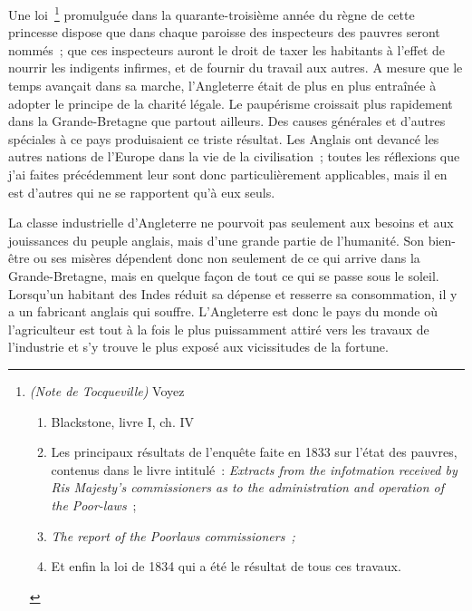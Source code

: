 \documentclass[twoside]{book} %
\begin{document}
Une loi \footnote{ \emph{(Note de Tocqueville)} Voyez\par
 
\begin{enumerate}[itemsep=0pt,topsep=0pt,partopsep=0pt,parskip=0pt]
\item Blackstone, livre I, ch. IV
\item Les principaux résultats de l’enquête faite en 1833 sur l’état des pauvres, contenus dans le livre intitulé : \emph{Extracts from the infotmation received by Ris Majesty's commissioners as to the administration and operation of the Poor-laws} ;
\item \emph{The report of the Poorlaws commissioners ;}
\item Et enfin la loi de 1834 qui a été le résultat de tous ces travaux.
\end{enumerate}

} promulguée dans la quarante-troisième année du règne de cette princesse dispose que dans chaque paroisse des inspecteurs des pauvres seront nommés ; que ces inspecteurs auront le droit de taxer les habitants à l’effet de nourrir les indigents infirmes, et de fournir du travail aux autres. A mesure que le temps avançait dans sa marche, l’Angleterre était de plus en plus entraînée à adopter le principe de la charité légale. Le paupérisme croissait plus rapidement dans la Grande-Bretagne que partout ailleurs. Des causes générales et d’autres spéciales à ce pays produisaient ce triste résultat. Les Anglais ont devancé les autres nations de l’Europe dans la vie de la civilisation ; toutes les réflexions que j’ai faites précédemment leur sont donc particulièrement applicables, mais il en est d’autres qui ne se rapportent qu’à eux seuls.\par
\bigbreak
\noindent La classe industrielle d’Angleterre ne pourvoit pas seulement aux besoins et aux jouissances du peuple anglais, mais d’une grande partie de l’humanité. Son bien-être ou ses misères dépendent donc non seulement de ce qui arrive dans la Grande-Bretagne, mais en quelque façon de tout ce qui se passe sous le soleil. Lorsqu’un habitant des Indes réduit sa dépense et resserre sa consommation, il y a un fabricant anglais qui souffre. L’Angleterre est donc le pays du monde où l’agriculteur est tout à la fois le plus puissamment attiré vers les travaux de l’industrie et s’y trouve le plus exposé aux vicissitudes de la fortune.\par
\end{document}
